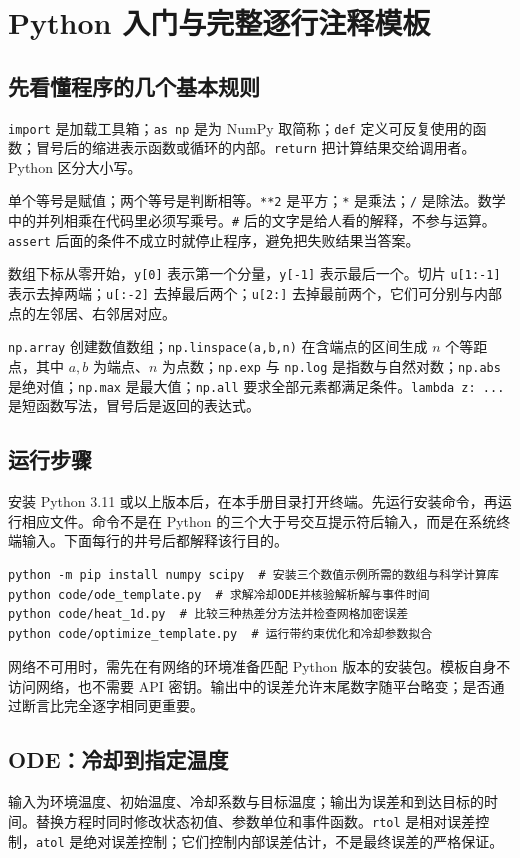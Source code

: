 \chapter{Python 入门与完整逐行注释模板}
\section{先看懂程序的几个基本规则}
\texttt{import} 是加载工具箱；\texttt{as np} 是为 NumPy 取简称；\texttt{def} 定义可反复使用的函数；冒号后的缩进表示函数或循环的内部。\texttt{return} 把计算结果交给调用者。Python 区分大小写。

单个等号是赋值；两个等号是判断相等。\texttt{**2} 是平方；\texttt{*} 是乘法；\texttt{/} 是除法。数学中的并列相乘在代码里必须写乘号。\texttt{\#} 后的文字是给人看的解释，不参与运算。\texttt{assert} 后面的条件不成立时就停止程序，避免把失败结果当答案。

数组下标从零开始，\texttt{y[0]} 表示第一个分量，\texttt{y[-1]} 表示最后一个。切片 \texttt{u[1:-1]} 表示去掉两端；\texttt{u[:-2]} 去掉最后两个；\texttt{u[2:]} 去掉最前两个，它们可分别与内部点的左邻居、右邻居对应。

\texttt{np.array} 创建数值数组；\texttt{np.linspace(a,b,n)} 在含端点的区间生成 $n$ 个等距点，其中 $a,b$ 为端点、$n$ 为点数；\texttt{np.exp} 与 \texttt{np.log} 是指数与自然对数；\texttt{np.abs} 是绝对值；\texttt{np.max} 是最大值；\texttt{np.all} 要求全部元素都满足条件。\texttt{lambda z: ...} 是短函数写法，冒号后是返回的表达式。

\section{运行步骤}
安装 Python 3.11 或以上版本后，在本手册目录打开终端。先运行安装命令，再运行相应文件。命令不是在 Python 的三个大于号交互提示符后输入，而是在系统终端输入。下面每行的井号后都解释该行目的。
\begin{Verbatim}[breaklines=true,breakanywhere=true,fontsize=\small]
python -m pip install numpy scipy  # 安装三个数值示例所需的数组与科学计算库
python code/ode_template.py  # 求解冷却ODE并核验解析解与事件时间
python code/heat_1d.py  # 比较三种热差分方法并检查网格加密误差
python code/optimize_template.py  # 运行带约束优化和冷却参数拟合
\end{Verbatim}
网络不可用时，需先在有网络的环境准备匹配 Python 版本的安装包。模板自身不访问网络，也不需要 API 密钥。输出中的误差允许末尾数字随平台略变；是否通过断言比完全逐字相同更重要。

\section{ODE：冷却到指定温度}
输入为环境温度、初始温度、冷却系数与目标温度；输出为误差和到达目标的时间。替换方程时同时修改状态初值、参数单位和事件函数。\texttt{rtol} 是相对误差控制，\texttt{atol} 是绝对误差控制；它们控制内部误差估计，不是最终误差的严格保证。

